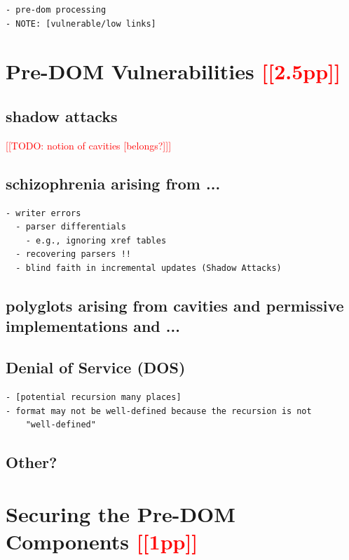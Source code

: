 \documentclass[conference,12pt]{IEEEtran}
\newcommand{\note}[1]{\noteYes{#1}}
\newcommand{\noteYes}[1]{\textcolor{red}{[[#1]]}}
\newcommand{\todo}[1]{\note{TODO: #1}}
\begin{document}
\begin{lstlisting}[style=meta]
- pre-dom processing
- NOTE: [vulnerable/low links]
\end{lstlisting}

\section{Pre-DOM Vulnerabilities \note{2.5pp}}
\label{sec:predom-vulnerabilities}

\subsection{shadow attacks}
\todo{notion of cavities [belongs?]}

\subsection{schizophrenia arising from ...}
\begin{lstlisting}[style=meta]
  - writer errors
  - parser differentials
    - e.g., ignoring xref tables
  - recovering parsers !!
  - blind faith in incremental updates (Shadow Attacks)
\end{lstlisting}

\subsection{polyglots arising from cavities and permissive implementations and ...}

\subsection{Denial of Service (DOS)}

\begin{lstlisting}[style=meta]
- [potential recursion many places]
- format may not be well-defined because the recursion is not
    "well-defined"
\end{lstlisting}

\subsection{Other?}

\section{Securing the Pre-DOM Components \note{1pp}}
\label{sec:securing}
\end{document}
